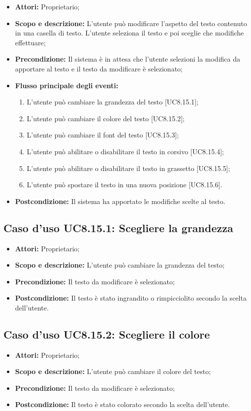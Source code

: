 \begin{itemize}
	\item \textbf{Attori:} Proprietario;
	\item \textbf{Scopo e descrizione:} L'utente può modificare l'aspetto del testo contenuto in una casella di testo. L'utente seleziona il testo e poi sceglie che modifiche effettuare;
	\item \textbf{Precondizione:} Il sistema è in attesa che l'utente selezioni la modifica da apportare al testo e il testo da modificare è selezionato;
	\item \textbf{Flusso principale degli eventi:}
	\begin{enumerate}
		\item L'utente può cambiare la grandezza del testo [UC8.15.1];
		\item L'utente può cambiare il colore del testo [UC8.15.2];
		\item L'utente può cambiare il font del testo [UC8.15.3];
		\item L'utente può abilitare o disabilitare il testo in corsivo [UC8.15.4];
		\item L'utente può abilitare o disabilitare il testo in grassetto [UC8.15.5];
		\item L'utente può spostare il testo in una nuova posizione [UC8.15.6].
	\end{enumerate}
	\item \textbf{Postcondizione:} Il sistema ha apportato le modifiche scelte al testo.
\end{itemize}

\subsection{Caso d'uso UC8.15.1: Scegliere la grandezza}
\begin{itemize}
	\item \textbf{Attori:} Proprietario;
	\item \textbf{Scopo e descrizione:} L'utente può cambiare la grandezza del testo;
	\item \textbf{Precondizione:} Il testo da modificare è selezionato;
	\item \textbf{Postcondizione:} Il testo è stato ingrandito o rimpicciolito secondo la scelta dell'utente.
\end{itemize}

\subsection{Caso d'uso UC8.15.2: Scegliere il colore}
\begin{itemize}
	\item \textbf{Attori:} Proprietario;
	\item \textbf{Scopo e descrizione:} L'utente può cambiare il colore del testo;
	\item \textbf{Precondizione:} Il testo da modificare è selezionato;
	\item \textbf{Postcondizione:} Il testo è stato colorato secondo la scelta dell'utente.
\end{itemize}

